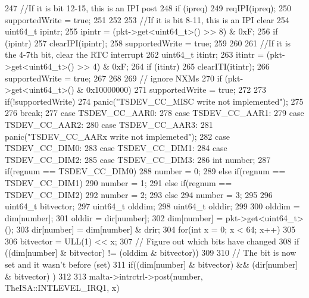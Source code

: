\begin{DoxyCode}
{{{247             //If it is bit 12-15, this is an IPI post
248             if (ipreq) {
249                 reqIPI(ipreq);
250                 supportedWrite = true;
251             }
252 
253             //If it is bit 8-11, this is an IPI clear
254             uint64_t ipintr;
255             ipintr = (pkt->get<uint64_t>() >> 8) & 0xF;
256             if (ipintr) {
257                 clearIPI(ipintr);
258                 supportedWrite = true;
259             }
260 
261             //If it is the 4-7th bit, clear the RTC interrupt
262             uint64_t itintr;
263               itintr = (pkt->get<uint64_t>() >> 4) & 0xF;
264             if (itintr) {
265                   clearITI(itintr);
266                 supportedWrite = true;
267             }
268 
269               // ignore NXMs
270               if (pkt->get<uint64_t>() & 0x10000000)
271                   supportedWrite = true;
272 
273             if(!supportedWrite)
274                   panic("TSDEV_CC_MISC write not implemented\n");
275 
276             break;
277             case TSDEV_CC_AAR0:
278             case TSDEV_CC_AAR1:
279             case TSDEV_CC_AAR2:
280             case TSDEV_CC_AAR3:
281                 panic("TSDEV_CC_AARx write not implemeted\n");
282             case TSDEV_CC_DIM0:
283             case TSDEV_CC_DIM1:
284             case TSDEV_CC_DIM2:
285             case TSDEV_CC_DIM3:
286                 int number;
287                 if(regnum == TSDEV_CC_DIM0)
288                     number = 0;
289                 else if(regnum == TSDEV_CC_DIM1)
290                     number = 1;
291                 else if(regnum == TSDEV_CC_DIM2)
292                     number = 2;
293                 else
294                     number = 3;
295 
296                 uint64_t bitvector;
297                 uint64_t olddim;
298                 uint64_t olddir;
299 
300                 olddim = dim[number];
301                 olddir = dir[number];
302                 dim[number] = pkt->get<uint64_t>();
303                 dir[number] = dim[number] & drir;
304                 for(int x = 0; x < 64; x++)
305                 {
306                     bitvector = ULL(1) << x;
307                     // Figure out which bits have changed
308                     if ((dim[number] & bitvector) != (olddim & bitvector))
309                     {
310                         // The bit is now set and it wasn't before (set)
311                         if((dim[number] & bitvector) && (dir[number] & bitvector)
      )
312                         {
313                           malta->intrctrl->post(number, TheISA::INTLEVEL_IRQ1, x)
}}}}}}
\end{DoxyCode}
